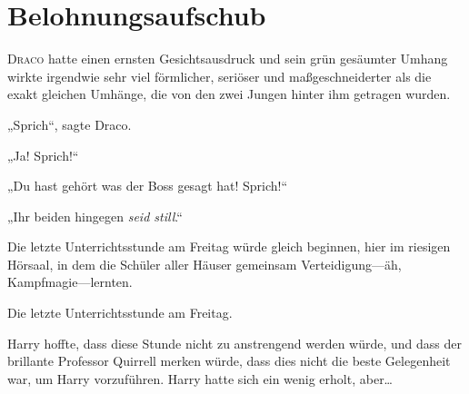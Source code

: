 \chapter{Belohnungsaufschub}


\lettrine{D}{raco} hatte einen ernsten Gesichtsausdruck und sein grün gesäumter Umhang wirkte irgendwie sehr viel förmlicher, seriöser und maßgeschneiderter als die exakt gleichen Umhänge, die von den zwei Jungen hinter ihm getragen wurden.

„Sprich“, sagte Draco.

„Ja! Sprich!“

„Du hast gehört was der Boss gesagt hat! Sprich!“

„Ihr beiden hingegen \emph{seid still}.“

Die letzte Unterrichtsstunde am Freitag würde gleich beginnen, hier im riesigen Hörsaal, in dem die Schüler aller Häuser gemeinsam Verteidigung—äh, Kampfmagie—lernten.

Die letzte Unterrichtsstunde am Freitag.

Harry hoffte, dass diese Stunde nicht zu anstrengend werden würde, und dass der brillante Professor Quirrell merken würde, dass dies nicht die beste Gelegenheit war, um Harry vorzuführen. Harry hatte sich ein wenig erholt, aber…

